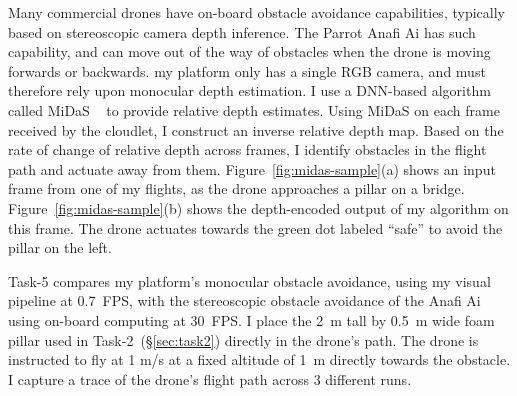 Many commercial drones have on-board obstacle avoidance capabilities,
typically based on stereoscopic camera depth inference.
The Parrot Anafi Ai has such capability, and can move out of the way
of obstacles when the drone is moving forwards or backwards. my
platform only has a single RGB camera, and must therefore rely upon
monocular depth estimation.  I use a DNN-based algorithm called MiDaS
~\cite{Ranftl2022} to provide relative depth estimates.  Using MiDaS
on each frame received by the cloudlet, I construct an inverse
relative depth map.  Based on the rate of change of relative depth
across frames, I identify obstacles in the flight path and actuate
away from them.  Figure~\ref{fig:midas-sample}(a) shows an input frame
from one of my flights, as the drone approaches a pillar on a bridge.
Figure~\ref{fig:midas-sample}(b) shows the depth-encoded output of my
algorithm on this frame.  The drone actuates towards the green dot
labeled ``safe'' to avoid the pillar on the left.

Task-5 compares my platform's monocular obstacle avoidance, using my
visual pipeline at 0.7~FPS, with the stereoscopic obstacle avoidance
of the Anafi Ai using on-board computing at 30~FPS.  I place the 2~m
tall by 0.5~m wide foam pillar used in Task-2~(\S\ref{sec:task2})
directly in the drone's path. The drone is instructed to fly at 1
m/s at a fixed altitude of 1~m directly towards the obstacle.  I
capture a trace of the drone's flight path across 3 different runs.

